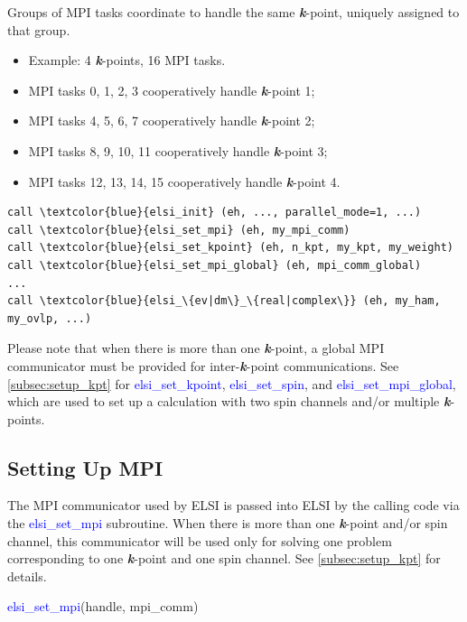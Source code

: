 \documentclass{report}
\begin{document}
Groups of MPI tasks coordinate to handle the same \textbf{\textit{k}}-point, uniquely assigned to that group.
\begin{itemize}
\item Example:  4 \textbf{\textit{k}}-points, 16 MPI tasks.
\item MPI tasks 0, 1, 2, 3 cooperatively handle \textbf{\textit{k}}-point 1;
\item MPI tasks 4, 5, 6, 7 cooperatively handle \textbf{\textit{k}}-point 2;
\item MPI tasks 8, 9, 10, 11 cooperatively handle \textbf{\textit{k}}-point 3;
\item MPI tasks 12, 13, 14, 15 cooperatively handle \textbf{\textit{k}}-point 4.
\end{itemize}

\begin{tcolorbox}
\begin{Verbatim}[commandchars=\\\{\}]
call \textcolor{blue}{elsi_init} (eh, ..., parallel_mode=1, ...)
call \textcolor{blue}{elsi_set_mpi} (eh, my_mpi_comm)
call \textcolor{blue}{elsi_set_kpoint} (eh, n_kpt, my_kpt, my_weight)
call \textcolor{blue}{elsi_set_mpi_global} (eh, mpi_comm_global)
...
call \textcolor{blue}{elsi_\{ev|dm\}_\{real|complex\}} (eh, my_ham, my_ovlp, ...)
\end{Verbatim}
\end{tcolorbox}

Please note that when there is more than one \textbf{\textit{k}}-point, a global MPI communicator must be provided for inter-\textbf{\textit{k}}-point communications.  See \ref{subsec:setup_kpt} for \textcolor{blue}{elsi\_set\_kpoint}, \textcolor{blue}{elsi\_set\_spin}, and \textcolor{blue}{elsi\_set\_mpi\_global}, which are used to set up a calculation with two spin channels and/or multiple \textbf{\textit{k}}-points.

\subsection{Setting Up MPI}
\label{subsec:setup_mpi}
The MPI communicator used by ELSI is passed into ELSI by the calling code via the \textcolor{blue}{elsi\_set\_mpi} subroutine.  When there is more than one \textbf{\textit{k}}-point and/or spin channel, this communicator will be used only for solving one problem corresponding to one \textbf{\textit{k}}-point and one spin channel.  See \ref{subsec:setup_kpt} for details.
\begin{labeling}{\hspace{6cm}}
\item [\hspace{0.3cm} \textcolor{blue}{elsi\_set\_mpi}(handle, mpi\_comm)]
\end{labeling}
\end{document}
